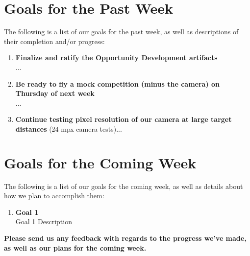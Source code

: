 \documentclass[]{../auvsi_doc}
\begin{document}
\section{Goals for the Past Week}

The following is a list of our goals for the past week, as well as descriptions of their completion and/or progress:

\begin{enumerate}
\item \textbf{Finalize and ratify the Opportunity Development artifacts}\\
...
\item \textbf{Be ready to fly a mock competition (minus the camera) on Thursday of next week}\\
...
\item \textbf{Continue testing pixel resolution of our camera at large target distances}
(24 mpx camera tests)...
\end{enumerate}

\section{Goals for the Coming Week}

The following is a list of our goals for the coming week, as well as details about how we plan to accomplish them:

\begin{enumerate}
\item \textbf{Goal 1}\\
Goal 1 Description
\end{enumerate}

\textbf{Please send us any feedback with regards to the progress we've made, as well as our plans for the coming week.}

\newpage
\begin{appendices}



\end{appendices}
\end{document}
